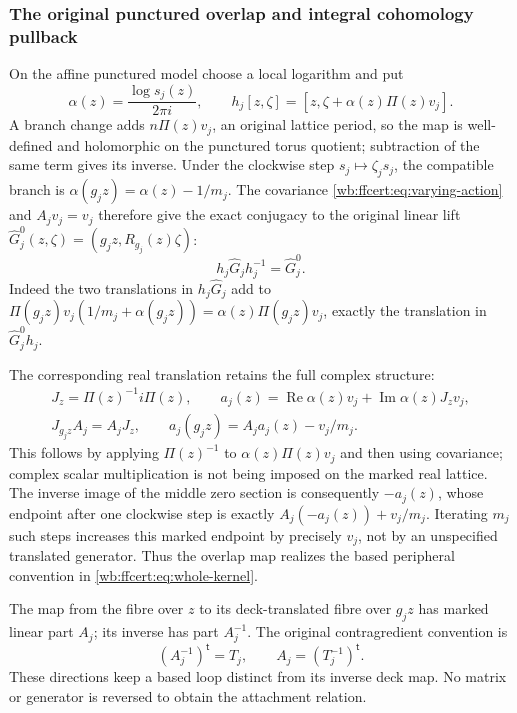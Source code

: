 \subsubsection{The original punctured overlap and integral cohomology pullback}

On the affine punctured model choose a local logarithm and put
\[
 \alpha(z)=\frac{\log s_j(z)}{2\pi i},\qquad
 h_j[z,\zeta]=[z,\zeta+\alpha(z)\Pi(z)v_j].
 \tag{FF36}\label{wb:ffcert:eq:overlap-map}
\]
A branch change adds $n\Pi(z)v_j$, an original lattice period,
so the map is well-defined and holomorphic on the punctured torus
quotient; subtraction of the same term gives its inverse. Under the
clockwise step $s_j\mapsto\zeta_js_j$, the compatible branch is
$\alpha(g_jz)=\alpha(z)-1/m_j$. The covariance
\eqref{wb:ffcert:eq:varying-action} and $A_jv_j=v_j$ therefore give
the exact conjugacy to the original linear lift
$\widehat G_j^0(z,\zeta)=(g_jz,R_{g_j}(z)\zeta)$:
\[
 h_j\widehat G_jh_j^{-1}=\widehat G_j^0.
 \tag{FF37}\label{wb:ffcert:eq:overlap-conjugacy}
\]
Indeed the two translations in $h_j\widehat G_j$ add to
$\Pi(g_jz)v_j(1/m_j+\alpha(g_jz))
=\alpha(z)\Pi(g_jz)v_j$, exactly the translation in
$\widehat G_j^0h_j$.

The corresponding real translation retains the full complex structure:
\[
\begin{gathered}
 J_z=\Pi(z)^{-1}i\Pi(z),\qquad
 a_j(z)=\operatorname{Re}\alpha(z)v_j
               +\operatorname{Im}\alpha(z)J_zv_j,\\
 J_{g_jz}A_j=A_jJ_z,\qquad
 a_j(g_jz)=A_ja_j(z)-v_j/m_j.
\end{gathered}
\tag{FF38}\label{wb:ffcert:eq:real-overlap}
\]
This follows by applying $\Pi(z)^{-1}$ to
$\alpha(z)\Pi(z)v_j$ and then using covariance; complex scalar
multiplication is not being imposed on the marked real lattice.
The inverse image of the middle zero section is consequently
$-a_j(z)$, whose endpoint after one clockwise step is exactly
$A_j(-a_j(z))+v_j/m_j$. Iterating $m_j$ such steps increases
this marked endpoint by precisely $v_j$, not by an unspecified
translated generator. Thus the overlap map realizes the based
peripheral convention in \eqref{wb:ffcert:eq:whole-kernel}.

The map from the fibre over $z$ to its deck-translated fibre over
$g_jz$ has marked linear part $A_j$; its inverse has part
$A_j^{-1}$. The original contragredient convention is
\[
 (A_j^{-1})^{\mathsf t}=T_j,
 \qquad A_j=(T_j^{-1})^{\mathsf t}.
 \tag{FF39}\label{wb:ffcert:eq:contragredient-direction}
\]
These directions keep a based loop distinct from its inverse deck
map. No matrix or generator is reversed to obtain the attachment relation.

